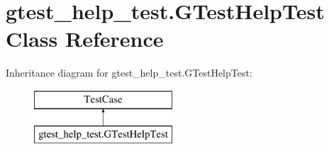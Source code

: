 \hypertarget{classgtest__help__test_1_1_g_test_help_test}{}\section{gtest\+\_\+help\+\_\+test.\+G\+Test\+Help\+Test Class Reference}
\label{classgtest__help__test_1_1_g_test_help_test}
Inheritance diagram for gtest\+\_\+help\+\_\+test.\+G\+Test\+Help\+Test\+:\begin{figure}[H]
\begin{center}
\leavevmode
\includegraphics[height=2.000000cm]{d8/d20/classgtest__help__test_1_1_g_test_help_test}
\end{center}
\end{figure}
